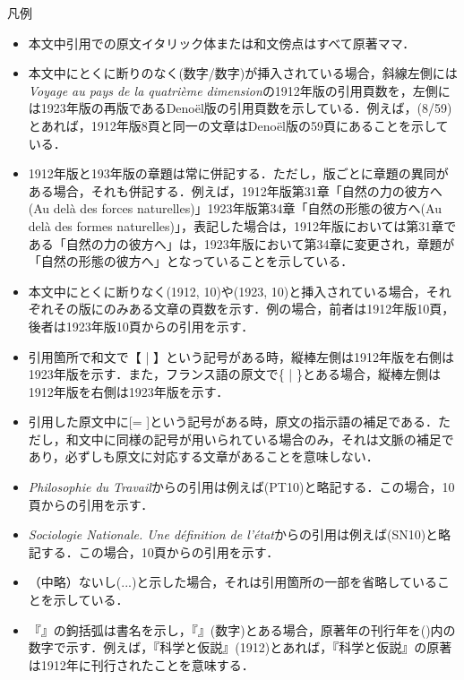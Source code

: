 \begin{center}
  {\Large 凡例\\}
\end{center}
\vspace{2cm}
\begin{itemize}
  \item 本文中引用での原文イタリック体または和文傍点はすべて原著ママ．
  \item 本文中にとくに断りのなく(数字/数字)が挿入されている場合，斜線左側には\emph{Voyage au pays de la quatrième dimension}の1912年版の引用頁数を，左側には1923年版の再版であるDenoël版の引用頁数を示している．例えば，(8/59)とあれば，1912年版8頁と同一の文章はDenoël版の59頁にあることを示している．
  \item 1912年版と193年版の章題は常に併記する．ただし，版ごとに章題の異同がある場合，それも併記する．例えば，1912年版第31章「自然の力の彼方へ(Au delà des forces naturelles)」1923年版第34章「自然の形態の彼方へ(Au delà des formes naturelles)」，表記した場合は，1912年版においては第31章である「自然の力の彼方へ」は，1923年版において第34章に変更され，章題が「自然の形態の彼方へ」となっていることを示している．
  \item 本文中にとくに断りなく(1912, 10)や(1923, 10)と挿入されている場合，それぞれその版にのみある文章の頁数を示す．例の場合，前者は1912年版10頁，後者は1923年版10頁からの引用を示す．
  \item 引用箇所で和文で【 | 】という記号がある時，縦棒左側は1912年版を右側は1923年版を示す．また，フランス語の原文で\{ | \}とある場合，縦棒左側は1912年版を右側は1923年版を示す．
  \item 引用した原文中に[= ]という記号がある時，原文の指示語の補足である．ただし，和文中に同様の記号が用いられている場合のみ，それは文脈の補足であり，必ずしも原文に対応する文章があることを意味しない．
  \item \emph{Philosophie du Travail}からの引用は例えば(PT10)と略記する．この場合，10頁からの引用を示す．
  \item \emph{Sociologie Nationale. Une définition de l'état}からの引用は例えば(SN10)と略記する．この場合，10頁からの引用を示す．
  \item （中略）ないし(...)と示した場合，それは引用箇所の一部を省略していることを示している．
  \item 『』の鉤括弧は書名を示し，『』(数字)とある場合，原著年の刊行年を()内の数字で示す．例えば，『科学と仮説』(1912)とあれば，『科学と仮説』の原著は1912年に刊行されたことを意味する．
\end{itemize}
